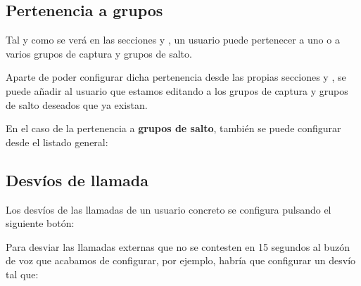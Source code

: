 \documentclass[letterpaper,10pt,spanish]{sphinxmanual}
\begin{document}
\subsection{Pertenencia a grupos}
\label{pbx_features/users:group-configuration}
\noindent{}

Tal y como se verá en las secciones {\hyperref[pbx_features/huntgroups:huntgroups]{}} y {\hyperref[pbx_features/call_captures:capture\string-groups]{}}, un usuario puede pertenecer a uno o a varios grupos de captura y grupos de salto.

Aparte de poder configurar dicha pertenencia desde las propias secciones {\hyperref[pbx_features/huntgroups:huntgroups]{}} y {\hyperref[pbx_features/call_captures:capture\string-groups]{}}, se puede añadir al usuario que estamos editando a los grupos de captura y grupos de salto deseados que ya existan.

En el caso de la pertenencia a \textbf{grupos de salto}, también se puede configurar desde el listado general:



\subsection{Desvíos de llamada}
\label{pbx_features/users:user-call-forward}
Los desvíos de las llamadas de un usuario concreto se configura pulsando el siguiente botón:

\label{pbx_features/users:fwd-to-vm}
Para desviar las llamadas externas que no se contesten en 15 segundos al buzón de voz que acabamos de configurar, por ejemplo, habría que configurar un desvío tal que:

\end{document}
